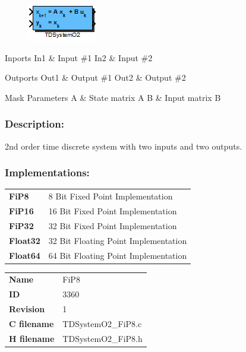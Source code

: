 \label{block:TDSystemO2}
\begin{figure}[H]\includegraphics{TDSystemO2}\end{figure} 

\begin{XtoCtabular}{Inports}
In1 & Input \#1\tabularnewline
\hline
In2 & Input \#2\tabularnewline
\hline
\end{XtoCtabular}


\begin{XtoCtabular}{Outports}
Out1 & Output \#1\tabularnewline
\hline
Out2 & Output \#2\tabularnewline
\hline
\end{XtoCtabular}

\begin{XtoCtabular}{Mask Parameters}
A & State matrix A\tabularnewline
\hline
B & Input matrix B\tabularnewline
\hline
\end{XtoCtabular}

\subsubsection*{Description:}
2nd order time discrete system with two inputs and two outputs.


\subsubsection*{Implementations:}
\begin{tabular}{l l}
\textbf{FiP8} & 8 Bit Fixed Point Implementation\tabularnewline
\textbf{FiP16} & 16 Bit Fixed Point Implementation\tabularnewline
\textbf{FiP32} & 32 Bit Fixed Point Implementation\tabularnewline
\textbf{Float32} & 32 Bit Floating Point Implementation\tabularnewline
\textbf{Float64} & 64 Bit Floating Point Implementation\tabularnewline
\end{tabular}

\nopagebreak[0]
\begin{tabular}{l l}
\textbf{Name} & FiP8 \tabularnewline
\textbf{ID} & 3360 \tabularnewline
\textbf{Revision} & 1 \tabularnewline
\textbf{C filename} & TDSystemO2\_FiP8.c \tabularnewline
\textbf{H filename} & TDSystemO2\_FiP8.h \tabularnewline
\end{tabular}
\vspace{1ex}

